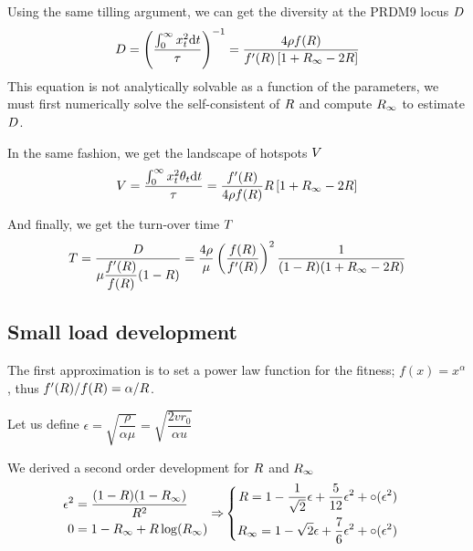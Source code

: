 \documentclass{article}
\begin{document}
Using the same tilling argument, we can get the diversity at the PRDM9 locus $D$
\begin{equation}
  D = \left(\dfrac{\int_{0}^{\infty } x_{t}^2 \mathrm{d}  t}{\tau}\right)^{-1} = \dfrac{4\rho f(R )}{f'(R )\left[ 1 + {R_{\infty}}  - 2 R   \right]} 
\end{equation}
This equation is not analytically solvable as a function of the parameters, we must first numerically solve the self-consistent of $R$ and compute ${R_{\infty}}$ to estimate $D$.

In the same fashion, we get the landscape of hotspots $V$
\begin{equation}
    V = \dfrac{\int_{0}^{\infty } x_{t}^2 \theta_{t} \mathrm{d}  t}{\tau} = \dfrac{f'(R )}{4 \rho f(R )}R \left[ 1 + {R_{\infty}}  - 2 R   \right] 
\end{equation}

And finally, we get the turn-over time $T$ 
\begin{equation}
  T = \dfrac{D}{\mu \dfrac{f'(R )}{ f(R )} (1-R )}  = \dfrac{4 \rho }{ \mu} \left( \dfrac{ f(R )}{f'(R )} \right)^2  \dfrac{1}{(1-R )( 1 + {R_{\infty}}  - 2 R   )} 
\end{equation}

\subsection*{Small load development}
The first approximation is to set a power law function for the fitness; $f(x)=x^{\alpha}$, thus $f'(R)/f(R)= \alpha / R$.

Let us define $\epsilon =  \sqrt{\dfrac{ \rho }{ \alpha \mu }} = \sqrt{\dfrac{2 v r_0}{\alpha u}}$

We derived a second order development for $R$ and ${R_{\infty}}$
\begin{align} 
  \begin{aligned}
    \epsilon^2  &= \dfrac{(1- R )(1- {R_{\infty}} )}{R^2} \\
     0 &= 1-{R_{\infty}}  + R  \operatorname{log}({R_{\infty}} ) \\    
     \end{aligned}
    \Rightarrow &
    \left\{
  \begin{aligned}
     R =  1 - \dfrac{1}{\sqrt{2}} \epsilon + \dfrac{5}{12} \epsilon^2 + \circ ( \epsilon^2)\\
     {R_{\infty}} =  1 - \sqrt{2} \epsilon + \dfrac{7}{6} \epsilon^2 + \circ ( \epsilon^2)\\
     \end{aligned}
  \right.
\end{align}
\end{document}
